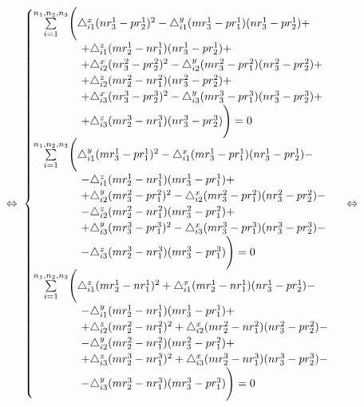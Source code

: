 $$ \Leftrightarrow \; \begin{cases}
	\underset{i=1}{\overset{n_1, n_2, n_3}{\sum}} \Bigg( 
		\triangle_{i1}^x (n r_3^1 - p r_2^1)^2 - \triangle_{i1}^y (m r_3^1 - p r_1^1) (n r_3^1 - p r_2^1) + \\
		\hspace{1.5cm} + \triangle_{i1}^z (m r_2^1 - n r_1^1) (n r_3^1 - p r_2^1) + \\
		\hspace{1.5cm} + \triangle_{i2}^x (n r_3^2 - p r_2^2)^2 - \triangle_{i2}^y (m r_3^2 - p r_1^2) (n r_3^2 - p r_2^2) + \\
		\hspace{1.5cm} + \triangle_{i2}^z (m r_2^2 - n r_1^2) (n r_3^2 - p r_2^2) + \\
		\hspace{1.5cm} + \triangle_{i3}^x (n r_3^3 - p r_2^3)^2 - \triangle_{i3}^y (m r_3^3 - p r_1^3) (n r_3^3 - p r_2^3) + \\
		\hspace{1.5cm} + \triangle_{i3}^z (m r_2^3 - n r_1^3) (n r_3^3 - p r_2^3) \Bigg) = 0 \\
	\underset{i=1}{\overset{n_1, n_2, n_3}{\sum}} \Bigg( 
		\triangle_{i1}^y (m r_3^1 - p r_1^1)^2 - \triangle_{i1}^x (m r_3^1 - p r_1^1) (n r_3^1 - p r_2^1) - \\
		\hspace{1.5cm} - \triangle_{i1}^z (m r_2^1 - n r_1^1) (m r_3^1 - p r_1^1) + \\
		\hspace{1.5cm} + \triangle_{i2}^y (m r_3^2 - p r_1^2)^2 - \triangle_{i2}^x (m r_3^2 - p r_1^2) (n r_3^2 - p r_2^2) - \\
		\hspace{1.5cm} - \triangle_{i2}^z (m r_2^2 - n r_1^2) (m r_3^2 - p r_1^2) + \\
		\hspace{1.5cm} + \triangle_{i3}^y (m r_3^3 - p r_1^3)^2 - \triangle_{i3}^x (m r_3^3 - p r_1^3) (n r_3^3 - p r_2^3) - \\
		\hspace{1.5cm} - \triangle_{i3}^z (m r_2^3 - n r_1^3) (m r_3^3 - p r_1^3) \Bigg) = 0 \\
	\underset{i=1}{\overset{n_1, n_2, n_3}{\sum}} \Bigg( 
		\triangle_{i1}^z (m r_2^1 - n r_1^1)^2 + \triangle_{i1}^x (m r_2^1 - n r_1^1) (n r_3^1 - p r_2^1) - \\
		\hspace{1.5cm} - \triangle_{i1}^y (m r_2^1 - n r_1^1) (m r_3^1 - p r_1^1) + \\
		\hspace{1.5cm} + \triangle_{i2}^z (m r_2^2 - n r_1^2)^2 + \triangle_{i2}^x (m r_2^2 - n r_1^2) (n r_3^2 - p r_2^2) - \\
		\hspace{1.5cm} - \triangle_{i2}^y (m r_2^2 - n r_1^2) (m r_3^2 - p r_1^2) + \\
		\hspace{1.5cm} + \triangle_{i3}^z (m r_2^3 - n r_1^3)^2 + \triangle_{i3}^x (m r_2^3 - n r_1^3) (n r_3^3 - p r_2^3) - \\
		\hspace{1.5cm} - \triangle_{i3}^y (m r_2^3 - n r_1^3) (m r_3^3 - p r_1^3) \Bigg) = 0
\end{cases} \; \Leftrightarrow$$
